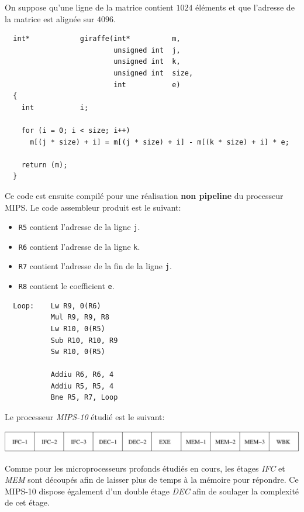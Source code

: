 On suppose qu'une ligne de la matrice contient $1024$ \'el\'ements
et que l'adresse de la matrice est align\'ee sur $4096$.

\begin{verbatim}
  int*            giraffe(int*          m,
                          unsigned int  j,
                          unsigned int  k,
                          unsigned int  size,
                          int           e)
  {
    int           i;

    for (i = 0; i < size; i++)
      m[(j * size) + i] = m[(j * size) + i] - m[(k * size) + i] * e;

    return (m);
  }
\end{verbatim}

Ce code est ensuite compil\'e pour une r\'ealisation \textbf{non pipeline}
du processeur MIPS. Le code assembleur produit est le suivant:

\begin{itemize}
  \item
    \texttt{R5} contient l'adresse de la ligne \texttt{j}.
  \item
    \texttt{R6} contient l'adresse de la ligne \texttt{k}.
  \item
    \texttt{R7} contient l'adresse de la fin de la ligne \texttt{j}.
  \item
    \texttt{R8} contient le coefficient \texttt{e}.
\end{itemize}

\begin{verbatim}
  Loop:    Lw R9, 0(R6)
           Mul R9, R9, R8
           Lw R10, 0(R5)
           Sub R10, R10, R9
           Sw R10, 0(R5)

           Addiu R6, R6, 4
           Addiu R5, R5, 4
           Bne R5, R7, Loop
\end{verbatim}

Le processeur \textit{MIPS-10} \'etudi\'e est le suivant:

\begin{center}
  \includegraphics[scale=0.6]{figures/pipeline.pdf}
\end{center}

Comme pour les microprocesseurs profonds \'etudi\'es en cours, les \'etages
\textit{IFC} et \textit{MEM} sont d\'ecoup\'es afin de laisser plus de temps
\`a la m\'emoire pour r\'epondre. Ce MIPS-10 dispose \'egalement d'un
double \'etage \textit{DEC} afin de soulager la complexit\'e de cet \'etage.

